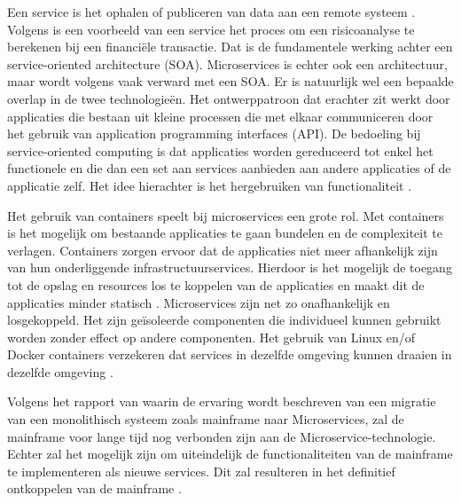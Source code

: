 Een service is het ophalen of publiceren van data aan een remote systeem \autocite{Linthicum2016}. Volgens \textcite{Linthicum2016} is een voorbeeld van een service het proces om een risicoanalyse te berekenen bij een financiële transactie. Dat is de fundamentele werking achter een service-oriented architecture (SOA). Microservices is echter ook een architectuur, maar wordt volgens \textcite{Linthicum2016} vaak verward met een SOA. Er is natuurlijk wel een bepaalde overlap in de twee technologieën. Het ontwerppatroon dat erachter zit werkt door applicaties die bestaan uit kleine processen die met elkaar communiceren door het gebruik van application programming interfaces (API). De bedoeling bij service-oriented computing is dat applicaties worden gereduceerd tot enkel het functionele en die dan een set aan services aanbieden aan andere applicaties of de applicatie zelf. Het idee hierachter is het hergebruiken van functionaliteit \autocite{Linthicum2016}. 

Het gebruik van containers speelt bij microservices een grote rol. Met containers is het mogelijk om bestaande applicaties te gaan bundelen en de complexiteit te verlagen. Containers zorgen ervoor dat de applicaties niet meer afhankelijk zijn van hun onderliggende infrastructuurservices. Hierdoor is het mogelijk de toegang tot de opslag en resources los te koppelen van de applicaties en maakt dit de applicaties minder statisch \autocite{Linthicum2016a}. Microservices zijn net zo onafhankelijk en losgekoppeld. Het zijn geïsoleerde componenten die individueel kunnen gebruikt worden zonder effect op andere componenten. Het gebruik van Linux en/of Docker containers verzekeren dat services in dezelfde omgeving kunnen draaien in dezelfde omgeving \autocite{Bucchiarone2018}.

Volgens het rapport van \textcite{Bucchiarone2018} waarin de ervaring wordt beschreven van een migratie van een monolithisch systeem zoals mainframe naar Microservices, zal de mainframe voor lange tijd nog verbonden zijn aan de Microservice-technologie. Echter zal het mogelijk zijn om uiteindelijk de functionaliteiten van de mainframe te implementeren als nieuwe services. Dit zal resulteren in het definitief ontkoppelen van de mainframe \autocite{Bucchiarone2018}. 


\subsection{}
\label{sec:Workloads migreren naar de cloud}

